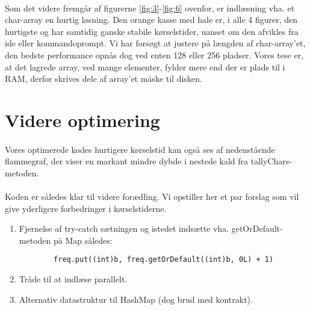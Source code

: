 \documentclass{article}
\begin{document}
\paragraph{}Som det videre fremgår af figurerne \ref*{fig:3}-\ref*{fig:6} ovenfor, er indlæsning vha. et char-array en hurtig løsning. Den orange kasse med hale er, i alle 4 figurer, den hurtigste og har samtidig ganske stabile kørselstider, uanset om den afvikles fra ide eller kommandoprompt.
Vi har forsøgt at justere på længden af char-array'et, den bedste performance opnås dog ved enten 128 eller 256 pladser. Vores tese er, at det lagrede array, ved mange elementer, fylder mere end der er plads til i RAM, derfor skrives dele af array'et måske til disken. 
\newpage
\section{Videre optimering}
\paragraph{}
Vores optimerede kodes hurtigere kørselstid kan også ses af nedenstående flammegraf, der viser en markant mindre dybde i nestede kald fra tallyChars-metoden.

\paragraph{}
Koden er således klar til videre forædling. Vi opstiller her et par forslag som vil give yderligere forbedringer i kørselstiderne.
\begin{enumerate}
    \item Fjernelse af try-catch sætningen og istedet indsætte vha. getOrDefault-metoden på Map således:\begin{verbatim}
        freq.put((int)b, freq.getOrDefault((int)b, 0L) + 1)
    \end{verbatim}    
    \item Tråde til at indlæse parallelt.
    \item Alternativ datastruktur til HashMap (dog brud med kontrakt).
\end{enumerate}
\end{document}
